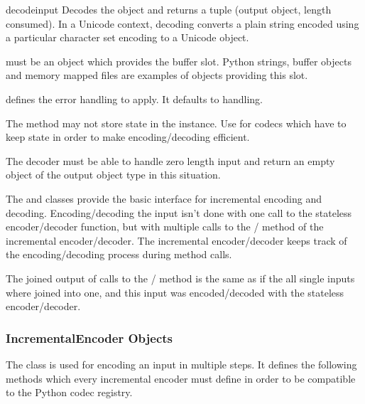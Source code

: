 \begin{methoddesc}{decode}{input}
  Decodes the object  and returns a tuple (output object,
  length consumed).  In a Unicode context, decoding converts a plain string
  encoded using a particular character set encoding to a Unicode object.

   must be an object which provides the 
  buffer slot.  Python strings, buffer objects and memory mapped files
  are examples of objects providing this slot.

   defines the error handling to apply. It defaults to
   handling.

  The method may not store state in the  instance. Use
   for codecs which have to keep state in order to
  make encoding/decoding efficient.

  The decoder must be able to handle zero length input and return an
  empty object of the output object type in this situation.
\end{methoddesc}

The  and  classes provide
the basic interface for incremental encoding and decoding. Encoding/decoding the
input isn't done with one call to the stateless encoder/decoder function,
but with multiple calls to the / method of the
incremental encoder/decoder. The incremental encoder/decoder keeps track of
the encoding/decoding process during method calls.

The joined output of calls to the / method is the
same as if the all single inputs where joined into one, and this input was
encoded/decoded with the stateless encoder/decoder.


\subsubsection{IncrementalEncoder Objects \label{incremental-encoder-objects}}


The  class is used for encoding an input in multiple
steps. It defines the following methods which every incremental encoder must
define in order to be compatible to the Python codec registry.

